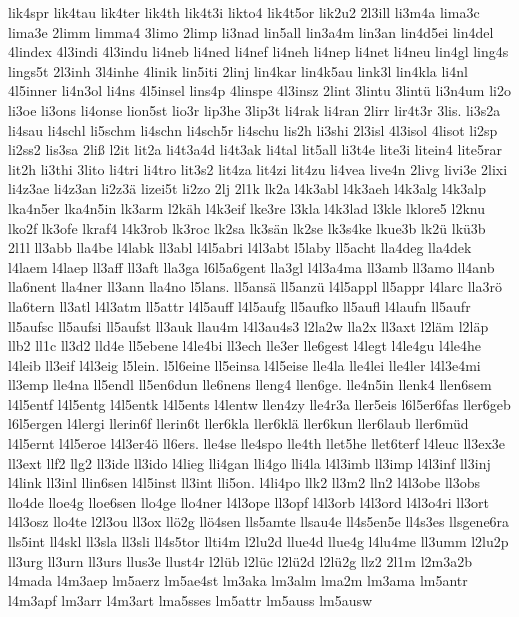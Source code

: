 {lik4spr
lik4tau
lik4ter
lik4th
lik4t3i
likto4
lik4t5or
lik2u2
2l3ill
li3m4a
lima3c
lima3e
2limm
limma4
3limo
2limp
li3nad
lin5all
lin3a4m
lin3an
lin4d5ei
lin4del
4lindex
4l3indi
4l3indu
li4neb
li4ned
li4nef
li4neh
li4nep
li4net
li4neu
lin4gl
ling4s
lings5t
2l3inh
3l4inhe
4linik
lin5iti
2linj
lin4kar
lin4k5au
link3l
lin4kla
li4nl
4l5inner
li4n3ol
li4ns
4l5insel
lins4p
4linspe
4l3insz
2lint
3lintu
3lintü
li3n4um
li2o
li3oe
li3ons
li4onse
lion5st
lio3r
lip3he
3lip3t
li4rak
li4ran
2lirr
lir4t3r
3lis.
li3s2a
li4sau
li4schl
li5schm
li4schn
li4sch5r
li4schu
lis2h
li3shi
2l3isl
4l3isol
4lisot
li2sp
li2ss2
lis3sa
2liß
l2it
lit2a
li4t3a4d
li4t3ak
li4tal
lit5all
li3t4e
lite3i
litein4
lite5rar
lit2h
li3thi
3lito
li4tri
li4tro
lit3s2
lit4za
lit4zi
lit4zu
li4vea
live4n
2livg
livi3e
2lixi
li4z3ae
li4z3an
li2z3ä
lizei5t
li2zo
2lj
2l1k
lk2a
l4k3abl
l4k3aeh
l4k3alg
l4k3alp
lka4n5er
lka4n5in
lk3arm
l2käh
l4k3eif
lke3re
l3kla
l4k3lad
l3kle
lklore5
l2knu
lko2f
lk3ofe
lkraf4
l4k3rob
lk3roc
lk2sa
lk3sän
lk2se
lk3s4ke
lkue3b
lk2ü
lkü3b
2l1l
ll3abb
lla4be
l4labk
ll3abl
l4l5abri
l4l3abt
l5laby
ll5acht
lla4deg
lla4dek
l4laem
l4laep
ll3aff
ll3aft
lla3ga
l6l5a6gent
lla3gl
l4l3a4ma
ll3amb
ll3amo
ll4anb
lla6nent
lla4ner
ll3ann
lla4no
l5lans.
ll5ansä
ll5anzü
l4l5appl
ll5appr
l4larc
lla3rö
lla6tern
ll3atl
l4l3atm
ll5attr
l4l5auff
l4l5aufg
ll5aufko
ll5aufl
l4laufn
ll5aufr
ll5aufsc
ll5aufsi
ll5aufst
ll3auk
llau4m
l4l3au4s3
l2la2w
lla2x
ll3axt
l2läm
l2läp
llb2
ll1c
ll3d2
lld4e
ll5ebene
l4le4bi
ll3ech
lle3er
lle6gest
l4legt
l4le4gu
l4le4he
l4leib
ll3eif
l4l3eig
l5lein.
l5l6eine
ll5einsa
l4l5eise
lle4la
lle4lei
lle4ler
l4l3e4mi
ll3emp
lle4na
ll5endl
ll5en6dun
lle6nens
lleng4
llen6ge.
lle4n5in
llenk4
llen6sem
l4l5entf
l4l5entg
l4l5entk
l4l5ents
l4lentw
llen4zy
lle4r3a
ller5eis
l6l5er6fas
ller6geb
l6l5ergen
l4lergi
llerin6f
llerin6t
ller6kla
ller6klä
ller6kun
ller6laub
ller6müd
l4l5ernt
l4l5eroe
l4l3er4ö
ll6ers.
lle4se
lle4spo
lle4th
llet5he
llet6terf
l4leuc
ll3ex3e
ll3ext
llf2
llg2
ll3ide
ll3ido
l4lieg
lli4gan
lli4go
lli4la
l4l3imb
ll3imp
l4l3inf
ll3inj
l4link
ll3inl
llin6sen
l4l5inst
ll3int
lli5on.
l4li4po
llk2
ll3m2
lln2
l4l3obe
ll3obs
llo4de
lloe4g
lloe6sen
llo4ge
llo4ner
l4l3ope
ll3opf
l4l3orb
l4l3ord
l4l3o4ri
ll3ort
l4l3osz
llo4te
l2l3ou
ll3ox
llö2g
llö4sen
lls5amte
llsau4e
ll4s5en5e
ll4s3es
llsgene6ra
lls5int
ll4skl
ll3sla
ll3sli
ll4s5tor
llti4m
l2lu2d
llue4d
llue4g
l4lu4me
ll3umm
l2lu2p
ll3urg
ll3urn
ll3urs
llus3e
llust4r
l2lüb
l2lüc
l2lü2d
l2lü2g
llz2
2l1m
l2m3a2b
l4mada
l4m3aep
lm5aerz
lm5ae4st
lm3aka
lm3alm
lma2m
lm3ama
lm5antr
l4m3apf
lm3arr
l4m3art
lma5sses
lm5attr
lm5auss
lm5ausw
}
